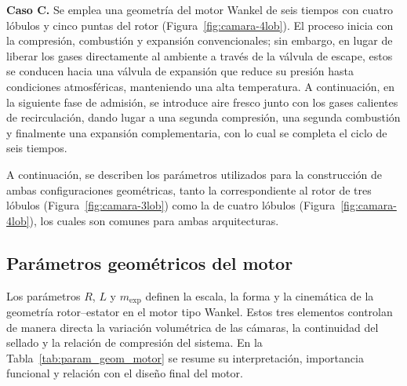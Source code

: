 \documentclass{LS}
\begin{document}
\textbf{Caso C.} Se emplea una geometría del motor Wankel de seis tiempos con cuatro lóbulos y cinco puntas del rotor (Figura~\ref{fig:camara-4lob}). El proceso inicia con la compresión, combustión y expansión convencionales; sin embargo, en lugar de liberar los gases directamente al ambiente a través de la válvula de escape, estos se conducen hacia una válvula de expansión que reduce su presión hasta condiciones atmosféricas, manteniendo una alta temperatura. A continuación, en la siguiente fase de admisión, se introduce aire fresco junto con los gases calientes de recirculación, dando lugar a una segunda compresión, una segunda combustión y finalmente una expansión complementaria, con lo cual se completa el ciclo de seis tiempos.


A continuación, se describen los parámetros utilizados para la construcción de ambas configuraciones geométricas, tanto la correspondiente al rotor de tres lóbulos (Figura~\ref{fig:camara-3lob}) como la de cuatro lóbulos (Figura~\ref{fig:camara-4lob}), los cuales son comunes para ambas arquitecturas.


\subsection*{Par\'ametros geom\'etricos del motor}

Los par\'ametros \( R \), \( L \) y \( m_{\text{exp}} \) definen la escala, la forma y la cinem\'atica de la geometr\'ia rotor--estator en el motor tipo Wankel.  
Estos tres elementos controlan de manera directa la variaci\'on volum\'etrica de las c\'amaras, la continuidad del sellado y la relaci\'on de compresi\'on del sistema.  
En la Tabla~\ref{tab:param_geom_motor} se resume su interpretaci\'on, importancia funcional y relaci\'on con el dise\~no final del motor.
\end{document}

